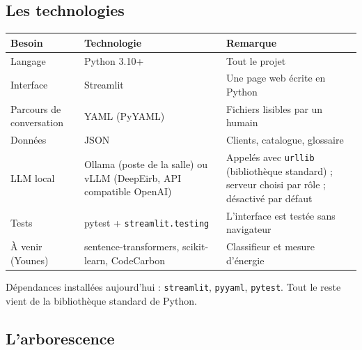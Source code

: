 \documentclass[11pt,a4paper]{article}
\DeclareRobustCommand{\f}[1]{{\texttt{\small\renewcommand{\_}{\char`\_\allowbreak}#1}}}
\begin{document}
\subsection{Les technologies}

\begin{center}\small
\begin{tabularx}{\textwidth}{@{}L{3.6cm} L{4.2cm} Y@{}}
\toprule
\textbf{Besoin} & \textbf{Technologie} & \textbf{Remarque} \\
\midrule
Langage & Python 3.10+ & Tout le projet \\
Interface & Streamlit & Une page web écrite en Python \\
Parcours de conversation & YAML (PyYAML) & Fichiers lisibles par un humain \\
Données & JSON & Clients, catalogue, glossaire \\
LLM local & Ollama (poste de la salle) ou vLLM (DeepEirb, API compatible OpenAI) & Appelés avec \f{urllib} (bibliothèque standard) ; serveur choisi par rôle ; désactivé par défaut \\
Tests & pytest + \f{streamlit.testing} & L'interface est testée sans navigateur \\
À venir (Younes) & sentence-transformers, scikit-learn, CodeCarbon & Classifieur et mesure d'énergie \\
\bottomrule
\end{tabularx}
\end{center}

Dépendances installées aujourd'hui : \f{streamlit}, \f{pyyaml}, \f{pytest}. Tout le reste vient
de la bibliothèque standard de Python.

\subsection{L'arborescence}
\end{document}
